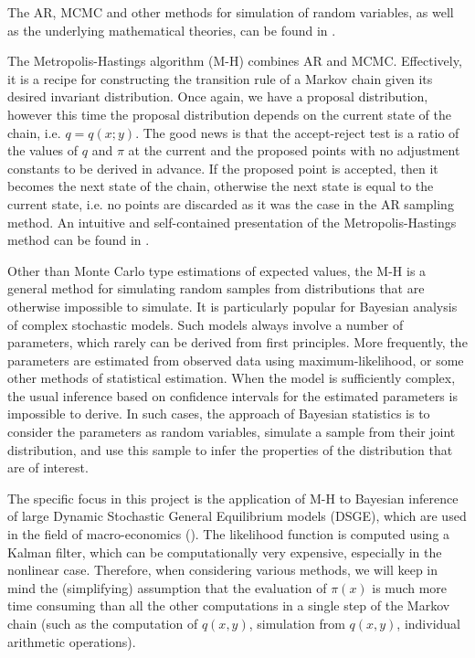 \documentclass[11pt]{article}       %
\begin{document}
The AR, MCMC and other methods for simulation of random variables, as well as
the underlying mathematical theories, can be found in \cite{ross.simulation}.


The Metropolis-Hastings algorithm (M-H) combines AR and MCMC.  Effectively, it
is a recipe for constructing the transition rule of a Markov chain given its
desired invariant distribution.  Once again, we have a proposal distribution,
however this time the proposal distribution depends on the current state of the
chain, i.e. $q=q(x;y)$. The good news is that the accept-reject test is a ratio
of the values of $q$ and $\pi$ at the current and the proposed points with no
adjustment constants to be derived in advance.  If the proposed point is
accepted, then it becomes the next state of the chain, otherwise the next state
is equal to the current state, i.e. no points are discarded as it was the case
in the AR sampling method.  An intuitive and self-contained presentation of the
Metropolis-Hastings method can be found in \cite{understanding.MH}.

Other than Monte Carlo type estimations of expected values, the M-H is a
general method for simulating random samples from distributions that are
otherwise impossible to simulate.  It is particularly popular for Bayesian
analysis of complex stochastic models.  Such models always involve a number of
parameters, which rarely can be derived from first principles.  More
frequently, the parameters are estimated from observed data using
maximum-likelihood, or some other methods of statistical estimation.  When the
model is sufficiently complex, the usual inference based on confidence
intervals for the estimated parameters is impossible to derive.  In such cases,
the approach of Bayesian statistics is to consider the parameters as random
variables,  simulate a sample from their joint distribution, and use this
sample to infer the properties of the distribution that are of interest.

The specific focus in this project is the application of M-H to Bayesian
inference of large Dynamic Stochastic General Equilibrium models (DSGE), which
are used in the field of macro-economics (\cite{strid2010adaptive}).  The
likelihood function is computed using a Kalman filter, which can be
computationally very expensive, especially in the nonlinear case.  Therefore,
when considering various methods, we will keep in mind the (simplifying)
assumption that the evaluation of $\pi(x)$ is much more time consuming than all
the other computations in a single step of the Markov chain (such as the
computation of $q(x,y)$, simulation from $q(x,y)$, individual arithmetic
operations). 
\end{document}
